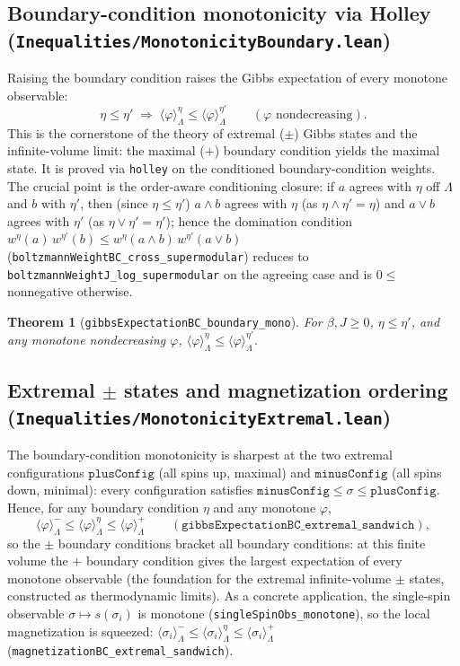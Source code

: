 \documentclass[a4paper,11pt]{article}
\newtheorem{theorem}{Theorem}
\begin{document}
\subsection{Boundary-condition monotonicity via Holley
(\texttt{Inequalities/MonotonicityBoundary.lean})}

Raising the boundary condition raises the Gibbs expectation of every monotone
observable:
\[
  \eta \le \eta' \;\Longrightarrow\; \langle \varphi \rangle^{\eta}_\Lambda
  \le \langle \varphi \rangle^{\eta'}_\Lambda
  \qquad (\varphi \text{ nondecreasing}).
\]
This is the cornerstone of the theory of extremal ($\pm$) Gibbs states and the
infinite-volume limit: the maximal ($+$) boundary condition yields the maximal
state. It is proved via \texttt{holley} on the conditioned boundary-condition
weights. The crucial point is the order-aware conditioning closure: if $a$ agrees
with $\eta$ off $\Lambda$ and $b$ with $\eta'$, then (since $\eta \le \eta'$)
$a \wedge b$ agrees with $\eta$ (as $\eta \wedge \eta' = \eta$) and $a \vee b$
agrees with $\eta'$ (as $\eta \vee \eta' = \eta'$); hence the domination
condition
$w^{\eta}(a)\, w^{\eta'}(b) \le w^{\eta}(a \wedge b)\, w^{\eta'}(a \vee b)$
(\texttt{boltzmannWeightBC\_cross\_supermodular}) reduces to
\texttt{boltzmannWeightJ\_log\_supermodular} on the agreeing case and is $0 \le$
nonnegative otherwise.

\begin{theorem}[\texttt{gibbsExpectationBC\_boundary\_mono}]
For $\beta, J \ge 0$, $\eta \le \eta'$, and any monotone nondecreasing $\varphi$,
$\langle \varphi \rangle^{\eta}_\Lambda \le \langle \varphi
\rangle^{\eta'}_\Lambda$.
\end{theorem}

\subsection{Extremal $\pm$ states and magnetization ordering
(\texttt{Inequalities/MonotonicityExtremal.lean})}

The boundary-condition monotonicity is sharpest at the two extremal
configurations $\texttt{plusConfig}$ (all spins up, maximal) and
$\texttt{minusConfig}$ (all spins down, minimal): every configuration satisfies
$\texttt{minusConfig} \le \sigma \le \texttt{plusConfig}$. Hence, for any boundary
condition $\eta$ and any monotone $\varphi$,
\[
  \langle \varphi \rangle^{-}_\Lambda \le \langle \varphi \rangle^{\eta}_\Lambda
  \le \langle \varphi \rangle^{+}_\Lambda
  \qquad (\texttt{gibbsExpectationBC\_extremal\_sandwich}),
\]
so the $\pm$ boundary conditions bracket all boundary conditions: at this finite
volume the $+$ boundary condition gives the largest expectation of every monotone
observable (the foundation for the extremal infinite-volume $\pm$ states,
constructed as thermodynamic limits). As a concrete application, the single-spin observable
$\sigma \mapsto s(\sigma_i)$ is monotone (\texttt{singleSpinObs\_monotone}), so the
local magnetization is squeezed:
$\langle \sigma_i \rangle^{-}_\Lambda \le \langle \sigma_i \rangle^{\eta}_\Lambda
\le \langle \sigma_i \rangle^{+}_\Lambda$
(\texttt{magnetizationBC\_extremal\_sandwich}).
\end{document}
